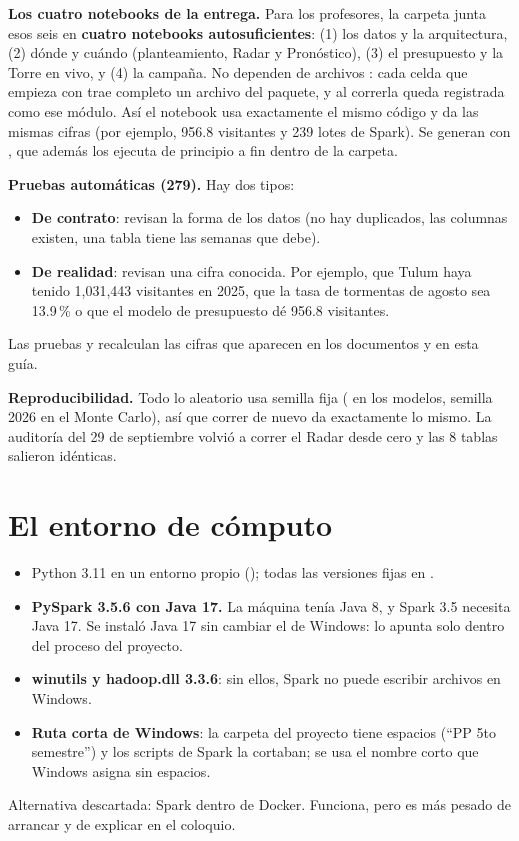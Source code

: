 \textbf{Los cuatro notebooks de la entrega.} Para los profesores, la carpeta  junta esos seis en
\textbf{cuatro notebooks autosuficientes}: (1) los datos y la arquitectura, (2) dónde y cuándo (planteamiento, Radar y
Pronóstico), (3) el presupuesto y la Torre en vivo, y (4) la campaña. No dependen de archivos : cada celda que
empieza con  trae completo un archivo del paquete, y al correrla queda registrada como ese módulo. Así
el notebook usa exactamente el mismo código y da las mismas cifras (por ejemplo, 956.8 visitantes y 239 lotes de Spark).
Se generan con , que además los ejecuta de principio a fin dentro de la carpeta.

\textbf{Pruebas automáticas (279).} Hay dos tipos:
\begin{itemize}
\item \textbf{De contrato}: revisan la forma de los datos (no hay duplicados, las columnas existen, una tabla tiene las
  semanas que debe).
\item \textbf{De realidad}: revisan una cifra conocida. Por ejemplo, que Tulum haya tenido 1,031,443 visitantes en 2025,
  que la tasa de tormentas de agosto sea 13.9\,\% o que el modelo de presupuesto dé 956.8 visitantes.
\end{itemize}
Las pruebas  y  recalculan las cifras que aparecen en los documentos y
en esta guía.

\textbf{Reproducibilidad.} Todo lo aleatorio usa semilla fija ( en los modelos, semilla 2026 en el
Monte Carlo), así que correr de nuevo da exactamente lo mismo. La auditoría del 29 de septiembre volvió a correr el Radar
desde cero y las 8 tablas salieron idénticas.

\section{El entorno de cómputo}
\begin{itemize}
\item Python 3.11 en un entorno propio (); todas las versiones fijas en .
\item \textbf{PySpark 3.5.6 con Java 17.} La máquina tenía Java 8, y Spark 3.5 necesita Java 17. Se instaló Java 17 sin
  cambiar el de Windows:  lo apunta solo dentro del proceso del proyecto.
\item \textbf{winutils y hadoop.dll 3.3.6}: sin ellos, Spark no puede escribir archivos en Windows.
\item \textbf{Ruta corta de Windows}: la carpeta del proyecto tiene espacios (``PP 5to semestre'') y los scripts de Spark
  la cortaban; se usa el nombre corto que Windows asigna sin espacios.
\end{itemize}
Alternativa descartada: Spark dentro de Docker. Funciona, pero es más pesado de arrancar y de explicar en el coloquio.

